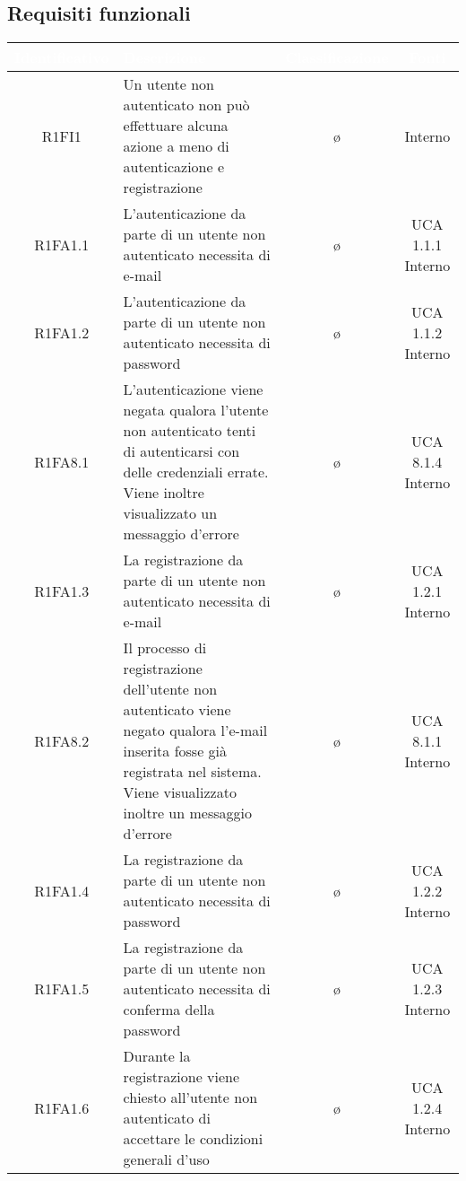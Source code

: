\subsection{Requisiti funzionali}
{
\renewcommand{\arraystretch}{1.5}
\centering
\begin{longtable}{ c C{8cm} c c}
\textcolor{white}{\textbf{Identificativo}} & \textcolor{white}{\textbf{Descrizione}} & \textcolor{white}{\textbf{Classificazione}} & \textcolor{white}{\textbf{Fonti}}\\	
\endhead

R1FI1 & Un utente non autenticato non può effettuare alcuna azione a meno di autenticazione e registrazione & \o & Interno\\

R1FA1.1 & L'autenticazione da parte di un utente non autenticato necessita di e-mail & \o & UCA 1.1.1 Interno\\

R1FA1.2 & L'autenticazione da parte di un utente non autenticato necessita di password & \o & UCA 1.1.2 Interno\\

R1FA8.1 & L'autenticazione viene negata qualora l'utente non autenticato tenti di autenticarsi con delle credenziali errate. Viene inoltre visualizzato un messaggio d'errore & \o & UCA 8.1.4 Interno\\

R1FA1.3 & La registrazione da parte di un utente non autenticato necessita di e-mail & \o & UCA 1.2.1 Interno\\

R1FA8.2 & Il processo di registrazione dell'utente non autenticato viene negato qualora l'e-mail inserita fosse già registrata nel sistema. Viene visualizzato inoltre un messaggio d'errore & \o & UCA 8.1.1 Interno\\

R1FA1.4 & La registrazione da parte di un utente non autenticato necessita di password & \o & UCA 1.2.2 Interno\\

R1FA1.5 & La registrazione da parte di un utente non autenticato necessita di conferma della password & \o & UCA 1.2.3 Interno\\

R1FA1.6 & Durante la registrazione viene chiesto all'utente non autenticato di accettare le condizioni generali d'uso & \o & UCA 1.2.4 Interno\\


\end{longtable}}
